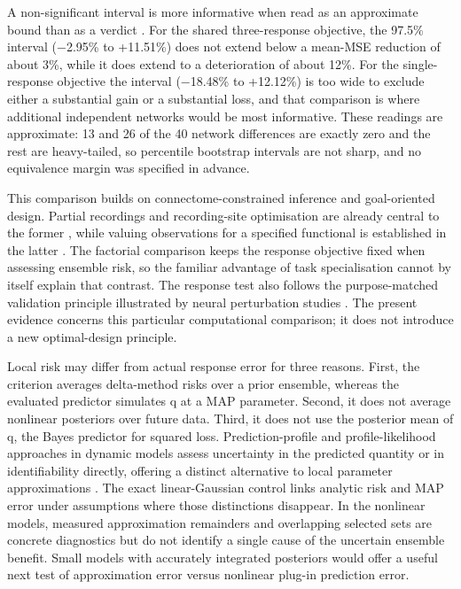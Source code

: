 A non-significant interval is more informative when read as an approximate bound than as a verdict \cite{ref36,ref37}. For the shared three-response objective, the 97.5\% interval (−2.95\% to +11.51\%) does not extend below a mean-MSE reduction of about 3\%, while it does extend to a deterioration of about 12\%. For the single-response objective the interval (−18.48\% to +12.12\%) is too wide to exclude either a substantial gain or a substantial loss, and that comparison is where additional independent networks would be most informative. These readings are approximate: 13 and 26 of the 40 network differences are exactly zero and the rest are heavy-tailed, so percentile bootstrap intervals are not sharp, and no equivalence margin was specified in advance.

This comparison builds on connectome-constrained inference and goal-oriented design. Partial recordings and recording-site optimisation are already central to the former \cite{ref05}, while valuing observations for a specified functional is established in the latter \cite{ref10}. The factorial comparison keeps the response objective fixed when assessing ensemble risk, so the familiar advantage of task specialisation cannot by itself explain that contrast. The response test also follows the purpose-matched validation principle illustrated by neural perturbation studies \cite{ref08}. The present evidence concerns this particular computational comparison; it does not introduce a new optimal-design principle.

Local risk may differ from actual response error for three reasons. First, the criterion averages delta-method risks over a prior ensemble, whereas the evaluated predictor simulates q at a MAP parameter. Second, it does not average nonlinear posteriors over future data. Third, it does not use the posterior mean of q, the Bayes predictor for squared loss. Prediction-profile and profile-likelihood approaches in dynamic models assess uncertainty in the predicted quantity or in identifiability directly, offering a distinct alternative to local parameter approximations \cite{ref12,ref23}. The exact linear-Gaussian control links analytic risk and MAP error under assumptions where those distinctions disappear. In the nonlinear models, measured approximation remainders and overlapping selected sets are concrete diagnostics but do not identify a single cause of the uncertain ensemble benefit. Small models with accurately integrated posteriors would offer a useful next test of approximation error versus nonlinear plug-in prediction error.

